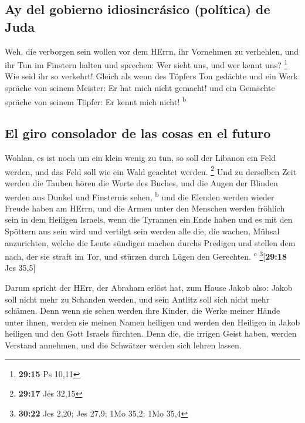 \hypertarget{ay-del-gobierno-idiosincruxe1sico-poluxedtica-de-juda}{%
\subsection{Ay del gobierno idiosincrásico (política) de
Juda}\label{ay-del-gobierno-idiosincruxe1sico-poluxedtica-de-juda}}

 Weh, die verborgen sein wollen vor dem HErrn, ihr
Vornehmen zu verhehlen, und ihr Tun im Finstern halten und sprechen: Wer
sieht uns, und wer kennt uns? \footnote{\textbf{29:15} Ps 10,11}
 Wie seid ihr so verkehrt! Gleich als wenn des Töpfers
Ton gedächte und ein Werk spräche von seinem Meister: Er hat mich nicht
gemacht! und ein Gemächte spräche von seinem Töpfer: Er kennt mich
nicht! \textsuperscript{b}

\hypertarget{el-giro-consolador-de-las-cosas-en-el-futuro}{%
\subsection{El giro consolador de las cosas en el
futuro}\label{el-giro-consolador-de-las-cosas-en-el-futuro}}

 Wohlan, es ist noch um ein klein wenig zu tun, so soll
der Libanon ein Feld werden, und das Feld soll wie ein Wald geachtet
werden. \footnote{\textbf{29:17} Jes 32,15}  Und zu
derselben Zeit werden die Tauben hören die Worte des Buches, und die
Augen der Blinden werden aus Dunkel und Finsternis sehen,
\textsuperscript{b}  und die Elenden werden wieder Freude
haben am HErrn, und die Armen unter den Menschen werden fröhlich sein in
dem Heiligen Israels,  wenn die Tyrannen ein Ende haben
und es mit den Spöttern aus sein wird und vertilgt sein werden alle die,
die wachen, Mühsal anzurichten,  welche die Leute
sündigen machen durchs Predigen und stellen dem nach, der sie straft im
Tor, und stürzen durch Lügen den Gerechten. \textsuperscript{c}
\footnote{\textbf{30:22} Jes 2,20; Jes 27,9; 1Mo 35,2; 1Mo 35,4}{[}\textbf{29:18}
Jes 35,5{]}

 Darum spricht der HErr, der Abraham erlöst hat, zum
Hause Jakob also: Jakob soll nicht mehr zu Schanden werden, und sein
Antlitz soll sich nicht mehr schämen.  Denn wenn sie
sehen werden ihre Kinder, die Werke meiner Hände unter ihnen, werden sie
meinen Namen heiligen und werden den Heiligen in Jakob heiligen und den
Gott Israels fürchten.  Denn die, die irrigen Geist
haben, werden Verstand annehmen, und die Schwätzer werden sich lehren
lassen.

